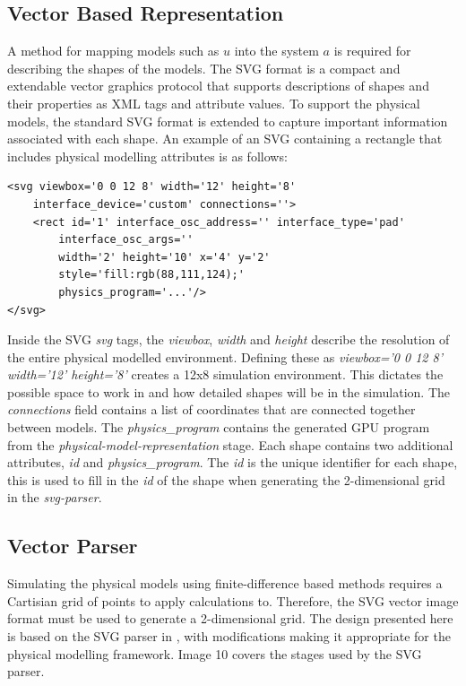 \documentclass[sigconf]{nimeart}
\begin{document}
\subsection{Vector Based Representation}\label{vector-based-representation}

A method for mapping models such as $u$ into the system $a$ is required for describing the shapes of the models. The SVG format is a compact and extendable vector graphics protocol that supports descriptions of shapes and their properties as XML tags and attribute values. To support the physical models, the standard SVG format is extended to capture important information associated with each shape. An example of an SVG containing a rectangle that includes physical modelling attributes is as follows:

\begin{Verbatim}[breaklines=true,breakanywhere=true,fontsize=\footnotesize]
<svg viewbox='0 0 12 8' width='12' height='8' 
    interface_device='custom' connections=''>
    <rect id='1' interface_osc_address='' interface_type='pad' 
        interface_osc_args=''
        width='2' height='10' x='4' y='2' 
        style='fill:rgb(88,111,124);'
        physics_program='...'/>
</svg>
\end{Verbatim}

Inside the SVG \emph{svg} tags, the \emph{viewbox}, \emph{width} and \emph{height} describe the resolution of the entire physical modelled environment. Defining these as \emph{viewbox='0 0 12 8' width='12' height='8'} creates a 12x8 simulation environment. This dictates the possible space to work in and how detailed shapes will be in the simulation. The \emph{connections} field contains a list of coordinates that are connected together between models. The \emph{physics\_program} contains the generated GPU program from the \emph{physical-model-representation} stage. Each shape contains two additional attributes, \emph{id} and \emph{physics\_program}. The \emph{id} is the unique identifier for each shape, this is used to fill in the \emph{id} of the shape when generating the 2-dimensional grid in the \emph{svg-parser}.

\subsection{Vector Parser}\label{vector-parser}

Simulating the physical models using finite-difference based methods requires a Cartisian grid of points to apply calculations to. Therefore, the SVG vector image format must be used to generate a 2-dimensional grid. The design presented here is based on the SVG parser in \cite{Gaster2019Fun}, with modifications making it appropriate for the physical modelling framework. Image 10 covers the stages used by the SVG parser.
\end{document}
